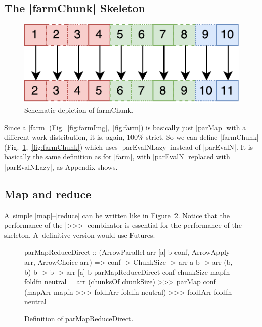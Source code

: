 \subsection{The |farmChunk| Skeleton}
\begin{figure}[h]
	\includegraphics[scale=0.7]{images/farmChunk}
\caption{Schematic depiction of farmChunk.}
\label{fig:farmChunkImg}
\end{figure}
Since a |farm| (Fig.~\ref{fig:farmImg},~\ref{fig:farm}) is basically just |parMap| with a different work distribution, it is, again, 100\% strict. So we can define |farmChunk| (Fig.~\ref{fig:farmChunkImg},~\ref{fig:farmChunk}) which uses |parEvalNLazy| instead of |parEvalN|. It is basically the same definition as for |farm|, with |parEvalN| replaced with |parEvalNLazy|, as Appendix shows.

\subsection{Map and reduce}

A~simple |map|--|reduce| can be written like in Figure~\ref{fig:parMapReduceDirect}. Notice that the performance of the |>>>| combinator is essential for the performance of the skeleton. A~definitive version would use Futures.





\begin{figure}[h]
\begin{code}
parMapReduceDirect :: (ArrowParallel arr [a] b conf, ArrowApply arr, ArrowChoice arr) =>
	conf -> ChunkSize -> arr a b -> arr (b, b) b -> b -> arr [a] b
parMapReduceDirect conf chunkSize mapfn foldfn neutral =
	arr (chunksOf chunkSize) >>>
	parMap conf (mapArr mapfn >>> foldlArr foldfn neutral) >>>
	foldlArr foldfn neutral
\end{code}
\caption{Definition of parMapReduceDirect.}
\label{fig:parMapReduceDirect}
\end{figure}


